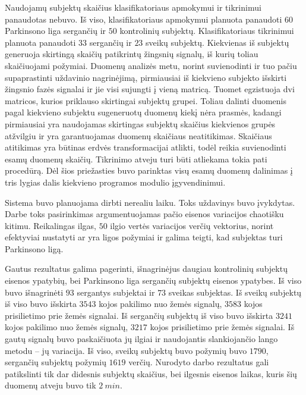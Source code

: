 \documentclass[]{vgtuef}
\begin{document}
Naudojamų subjektų skaičius klasifikatoriaus apmokymui ir tikrinimui panaudotas nebuvo. Iš viso, klasifikatoriaus apmokymui planuota panaudoti $60$ Parkinsono liga sergančių ir $50$ kontrolinių subjektų. Klasifikatoriaus tikrinimui planuota panaudoti $33$ sergančių ir $23$ sveikų subjektų. Kiekvienas iš subjektų generuoja skirtingą skaičių patikrintų žingsnių signalų, iš kurių toliau skaičiuojami požymiai. Duomenų analizės metu, norint suvienodinti ir tuo pačiu supaprastinti uždavinio nagrinėjimą, pirmiausiai iš kiekvieno subjekto išskirti žingsnio fazės signalai ir jie visi sujungti į vieną matricą. Tuomet egzistuoja dvi matricos, kurios priklauso skirtingai subjektų grupei. Toliau dalinti duomenis pagal kiekvieno subjektu sugeneruotų duomenų kiekį nėra prasmės, kadangi pirmiausiai yra naudojamas skirtingas subjektų skaičius kiekvienos grupės atžvilgiu ir yra garantuojamas duomenų skaičiaus neatitikimas. Skaičiaus atitikimas yra būtinas erdvės transformacijai atlikti, todėl reikia suvienodinti esamų duomenų skaičių. Tikrinimo atveju turi būti atliekama tokia pati procedūrą. Dėl šios priežasties buvo parinktas visų esamų duomenų dalinimas į tris lygias dalis kiekvieno programos modulio įgyvendinimui.

Sistema buvo planuojama dirbti nerealiu laiku. Toks uždavinys buvo įvykdytas. Darbe toks pasirinkimas argumentuojamas pačio eisenos variacijos chaotišku kitimu. Reikalingas ilgas, $50$ ilgio vertės variacijos verčių vektorius, norint efektyviai nustatyti ar yra ligos požymiai ir galima teigti, kad subjektas turi Parkinsono ligą.


Gautus rezultatus galima pagerinti, išnagrinėjus daugiau kontrolinių subjektų eisenos ypatybių, bei Parkinsono liga sergančių subjektų eisenos ypatybes. Iš viso buvo išnagrinėti $93$ sergantys subjektai ir $73$ sveikas subjektas. Iš sveikų subjektų iš viso buvo išskirta $3543$ kojos pakilimo nuo žemės signalų, $3583$ kojos prisilietimo prie žemės signalai. Iš sergančių subjektų iš viso buvo išskirta $3241$ kojos pakilimo nuo žemės signalų, $3217$ kojos prisilietimo prie žemės signalai. Iš gautų signalų buvo paskaičiuota jų ilgiai ir naudojantis slankiojančio lango metodu -- jų variacija. Iš viso, sveikų subjektų buvo požymių buvo $1790$, sergančių subjektų požymių $1619$ verčių. Nurodyto darbo rezultatus gali patikslinti tik dar didesnis subjektų skaičius, bei ilgesnis eisenos laikas, kuris šių duomenų atveju buvo tik $2~min$.
\end{document}
